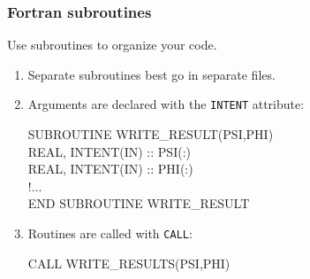 \documentclass[aspectratio=43,9pt]{beamer}
\begin{document}
%
%
\begin{frame}
	\frametitle{Fortran subroutines}
	Use subroutines to organize your code.\vspace*{2ex}
	\begin{enumerate}	
		\item Separate subroutines best go in separate files.
		\item Arguments are declared with the \texttt{INTENT} attribute:
			\par\vspace*{1ex}\hspace*{.05\textwidth}\parbox{.8\textwidth}{\ttfamily\small
				\textcolor{green!80!black}{SUBROUTINE} WRITE\_RESULT(PSI,PHI)\\[3ex]
				REAL, \textcolor{green!80!black}{INTENT(IN)} :: PSI(:)\\
				REAL, \textcolor{green!80!black}{INTENT(IN)} :: PHI(:)\\[3ex]
				!...\\[3ex]
				\textcolor{green!80!black}{END SUBROUTINE} WRITE\_RESULT
			}\vspace*{1ex}\par
		\item Routines are called with \texttt{CALL}:
			\par\vspace*{1ex}\hspace*{.05\textwidth}\parbox{.8\textwidth}{\ttfamily\small
				\textcolor{green!80!black}{CALL} WRITE\_RESULTS(PSI,PHI)
			}\vspace*{1ex}\par
	\end{enumerate}
\end{frame}
%
%
\end{document}

